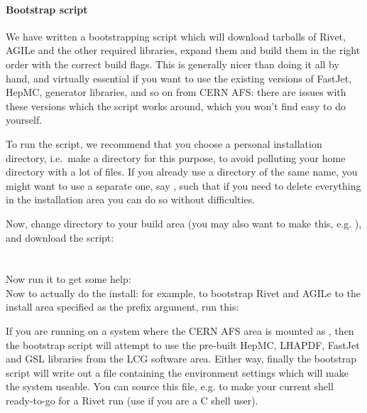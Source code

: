 \paragraph{Bootstrap script}

We have written a bootstrapping
script which will download tarballs of Rivet, AGILe and the other required
libraries, expand them and build them in the right order with the correct build
flags. This is generally nicer than doing it all by hand, and virtually
essential if you want to use the existing versions of FastJet, HepMC, generator
libraries, and so on from CERN AFS: there are issues with these versions which
the script works around, which you won't find easy to do yourself.

To run the script, we recommend that you choose a personal installation
directory, i.e.\ make a  directory for this purpose, to
avoid polluting your home directory with a lot of files. If you already use a
directory of the same name, you might want to use a separate one, say
, such that if you need to delete everything in the
installation area you can do so without difficulties.

Now, change directory to your build area (you may also want to make this,
e.g. ), and download the script:\\
\\
\\
Now run it to get some help:
\\
Now to actually do the install: for example, to bootstrap Rivet and AGILe
to the install area specified as the prefix argument, run this:\\

If you are running on a system where the CERN AFS area is mounted as
, then the bootstrap script will attempt to use the pre-built
HepMC\cite{Dobbs:2001ck}, LHAPDF\cite{Whalley:2005nh},
FastJet\cite{Cacciari:2005hq,fastjetweb} and GSL libraries from the LCG software area.
Either way, finally the bootstrap script will write out a file containing the
environment settings which will make the system useable. You can source this
file, e.g.  to make your current shell ready-to-go
for a Rivet run (use  if you are a C shell user).

